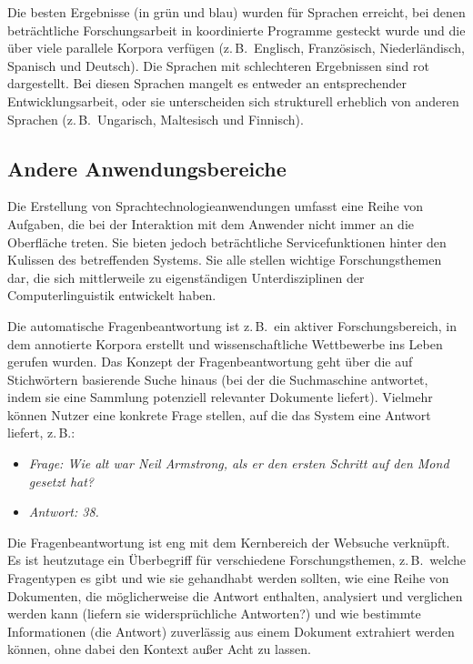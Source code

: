 \documentclass[]{../../metanetpaper}
\begin{document}
\begin{multicols}{2}
Die besten Ergebnisse (in grün und blau) wurden für Sprachen erreicht, bei denen beträchtliche Forschungsarbeit in koordinierte Programme gesteckt wurde und die über viele parallele Korpora verfügen (z.\,B.~Englisch, Französisch, Niederländisch, Spanisch und Deutsch). Die Sprachen mit schlechteren Ergebnissen sind rot dargestellt. Bei diesen Sprachen mangelt es entweder an entsprechender Entwicklungsarbeit, oder sie unterscheiden sich strukturell erheblich von anderen Sprachen (z.\,B.~Ungarisch, Maltesisch und Finnisch).

\subsection{Andere Anwendungsbereiche}

Die Erstellung von Sprachtechnologieanwendungen umfasst eine Reihe von Aufgaben, die bei der Interaktion mit dem Anwender nicht immer an die Oberfläche treten. Sie bieten jedoch beträchtliche Servicefunktionen hinter den Kulissen des betreffenden Systems. Sie alle stellen wichtige Forschungsthemen dar, die sich mittlerweile zu eigenständigen Unterdisziplinen der Computerlinguistik entwickelt haben. 

Die automatische Fragenbeantwortung ist z.\,B.~ein aktiver Forschungsbereich, in dem annotierte Korpora erstellt und wissenschaftliche Wettbewerbe ins Leben gerufen wurden. Das Konzept der Fragenbeantwortung geht über die auf Stichwörtern basierende Suche hinaus (bei der die Suchmaschine antwortet, indem sie eine Sammlung potenziell relevanter Dokumente liefert). Vielmehr können Nutzer eine konkrete Frage stellen, auf die das System eine Antwort liefert, z.\,B.:

\begin{itemize}
\item[] \textit{Frage: Wie alt war Neil Armstrong, als er den ersten Schritt auf den Mond gesetzt hat?}
\item[] \textit{Antwort: 38.}
\end{itemize}

Die Fragenbeantwortung ist eng mit dem Kernbereich der Websuche verknüpft. Es ist heutzutage ein Überbegriff für verschiedene Forschungsthemen, z.\,B.~welche Fragentypen es gibt und wie sie gehandhabt werden sollten, wie eine Reihe von Dokumenten, die möglicherweise die Antwort enthalten, analysiert und verglichen werden kann (liefern sie widersprüchliche Antworten?) und wie bestimmte Informationen (die Antwort) zuverlässig aus einem Dokument extrahiert werden können, ohne dabei den Kontext außer Acht zu lassen.


\end{multicols}
\end{document}

